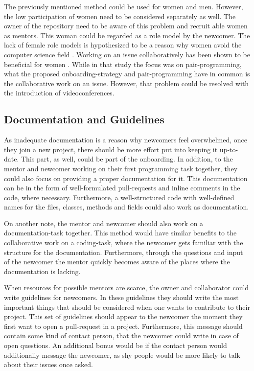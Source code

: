 \documentclass[a4paper, 11pt]{article}
\begin{document}
The previously mentioned method could be used for women and men. However, the low participation of women need to be considered separately as well. The owner of the repository need to be aware of this problem and recruit able women as mentors. This woman could be regarded as a role model by the newcomer. The lack of female role models is hypothesized to be a reason why women avoid the computer science field \cite{computer-science-women}. Working on an issue collaboratively has been shown to be beneficial for women \cite{pair-programming}. While in that study the focus was on pair-programming, what the proposed onboarding-strategy and pair-programming have in common is the collaborative work on an issue. However, that problem could be resolved with the introduction of videoconferences.

\subsection{Documentation and Guidelines}
As inadequate documentation is a reason why newcomers feel overwhelmed, once they join a new project, there should be more effort put into keeping it up-to-date. This part, as well, could be part of the onboarding. In addition, to the mentor and newcomer working on their first programming task together, they could also focus on providing a proper documentation for it. This documentation can be in the form of well-formulated pull-requests and inline comments in the code, where necessary. Furthermore, a well-structured code with well-defined names for the files, classes, methods and fields could also work as documentation. \newline

On another note, the mentor and newcomer should also work on a documentation-task together. This method would have similar benefits to the collaborative work on a coding-task, where the newcomer gets familiar with the structure for the documentation. Furthermore, through the questions and input of the newcomer the mentor quickly becomes aware of the places where the documentation is lacking. \newline

When resources for possible mentors are scarce, the owner and collaborator could write guidelines for newcomers. In these guidelines they should write the most important things that should be considered when one wants to contribute to their project. This set of guidelines should appear to the newcomer the moment they first want to open a pull-request in a project. Furthermore, this message should contain some kind of contact person, that the newcomer could write in case of open questions. An additional bonus would be if the contact person would additionally message the newcomer, as shy people would be more likely to talk about their issues once asked.
\end{document}
